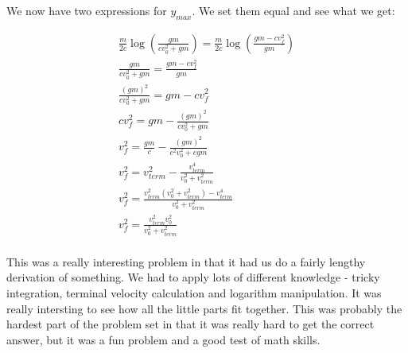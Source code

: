 \documentclass[10pt]{article} %
\begin{document}
We now have two expressions for $y_{max}$. We set them equal and see what we get:

\begin{align}
  \frac{m}{2c} \log(\frac{gm}{cv_0^2 + gm}) = \frac{m}{2c} \log(\frac{gm - cv_f^2}{gm})\\
  \frac{gm}{cv_0^2 + gm} = \frac{gm - cv_f^2}{gm}\\
  \frac{(gm)^2}{cv_0^2 + gm} = gm - cv_f^2\\
  cv_f^2 = gm - \frac{(gm)^2}{cv_0^2 + gm}\\
  v_f^2 = \frac{gm}{c} - \frac{(gm)^2}{c^2v_0^2 + cgm}\\
  v_f^2 = v_{term}^2 - \frac{v_{term}^4}{v_0^2 + v_{term}^2}\\
  v_f^2 = \frac{v_{term}^2(v_0^2 + v_{term}^2) - v_{term}^4}{v_0^2 + v_{term}^2}\\
  v_f^2 = \frac{v_{term}^2v_0^2}{v_0^2 + v_{term}^2}\\      
\end{align}

This was a really interesting problem in that it had us do a fairly lengthy derivation of something. We had to apply lots of different knowledge - tricky integration, terminal velocity calculation and logarithm manipulation. It was really intersting to see how all the little parts fit together. This was probably the hardest part of the problem set in that it was really hard to get the correct answer, but it was a fun problem and a good test of math skills.\\
\end{document}
